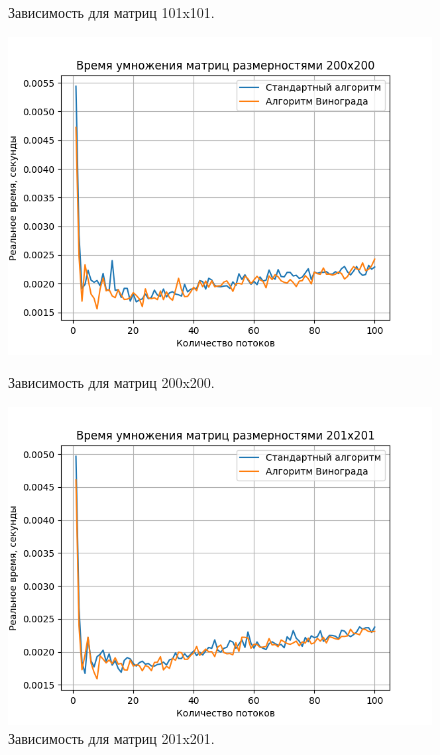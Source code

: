 \documentclass[a4paper,12pt]{article}
\begin{document}
\begin{figure}[h]
\begin{center}
\begin{minipage}[H]{0.48\linewidth}
\caption{Зависимость для матриц 101x101.}
\label{ris:experimcoded}
\end{minipage}
\end{center}
\begin{center}
\begin{minipage}[H]{0.48\linewidth}
\includegraphics[width=1\linewidth]{200x200.png}
\caption{Зависимость для матриц 200x200.}
\label{ris:experimoriginal}
\end{minipage}
\hfill
\begin{minipage}[H]{0.48\linewidth}
\includegraphics[width=1\linewidth]{201x201.png}
\caption{Зависимость для матриц 201x201.}
\label{ris:experimcoded}
\end{minipage}
\end{center}
\end{figure}
\end{document}
